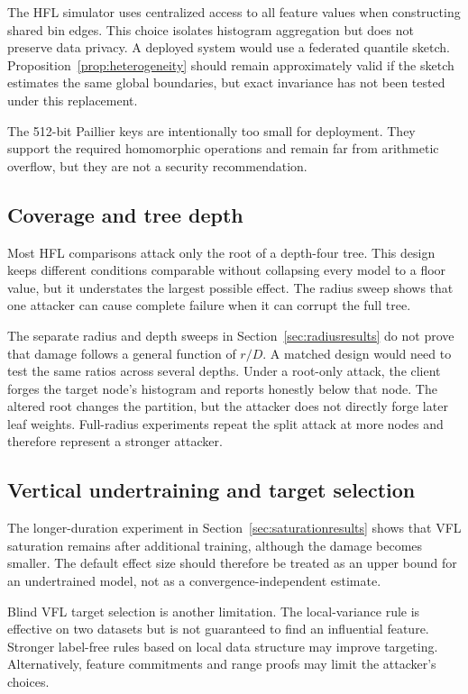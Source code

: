 \documentclass[11pt]{article}
\begin{document}
The HFL simulator uses centralized access to all feature values when constructing shared bin edges. This choice isolates histogram aggregation but does not preserve data privacy. A deployed system would use a federated quantile sketch. Proposition~\ref{prop:heterogeneity} should remain approximately valid if the sketch estimates the same global boundaries, but exact invariance has not been tested under this replacement.

The 512-bit Paillier keys are intentionally too small for deployment. They support the required homomorphic operations and remain far from arithmetic overflow, but they are not a security recommendation.

\subsection{Coverage and tree depth}

Most HFL comparisons attack only the root of a depth-four tree. This design keeps different conditions comparable without collapsing every model to a floor value, but it understates the largest possible effect. The radius sweep shows that one attacker can cause complete failure when it can corrupt the full tree.

The separate radius and depth sweeps in Section~\ref{sec:radiusresults} do not prove that damage follows a general function of $r/D$. A matched design would need to test the same ratios across several depths. Under a root-only attack, the client forges the target node's histogram and reports honestly below that node. The altered root changes the partition, but the attacker does not directly forge later leaf weights. Full-radius experiments repeat the split attack at more nodes and therefore represent a stronger attacker.

\subsection{Vertical undertraining and target selection}

The longer-duration experiment in Section~\ref{sec:saturationresults} shows that VFL saturation remains after additional training, although the damage becomes smaller. The default effect size should therefore be treated as an upper bound for an undertrained model, not as a convergence-independent estimate.

Blind VFL target selection is another limitation. The local-variance rule is effective on two datasets but is not guaranteed to find an influential feature. Stronger label-free rules based on local data structure may improve targeting. Alternatively, feature commitments and range proofs may limit the attacker's choices.
\end{document}
